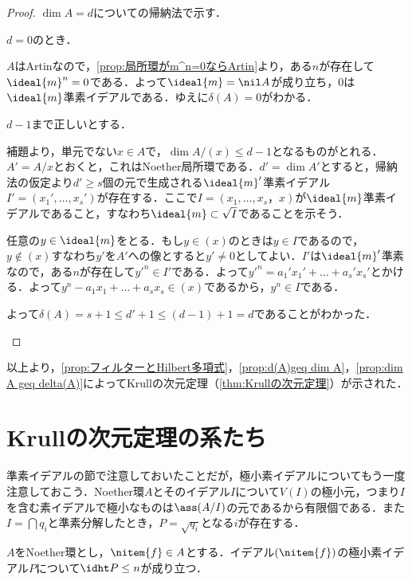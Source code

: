 \begin{proof}
	$\dim A=d$についての帰納法で示す．
	
	\begin{step}
		\item $d=0$のとき．
		
		$A$はArtinなので，\ref{prop:局所環がm^n=0ならArtin}より，ある$n$が存在して$\ideal{m}^n=0$である．よって$\ideal{m}=\nil A$が成り立ち，$0$は$\ideal{m}$準素イデアルである．ゆえに$\delta(A)=0$がわかる．
		
		\item $d-1$まで正しいとする．
		
		補題より，単元でない$x\in A$で，$\dim A/(x)\leq d-1$となるものがとれる．$A'=A/x$とおくと，これはNoether局所環である．$d'=\dim A'$とすると，帰納法の仮定より$d'\geq s$個の元で生成される$\ideal{m}'$準素イデアル$I'=(x_1',\dots,x_s')$が存在する．ここで$I=(x_1,\dots,x_s，x)$が$\ideal{m}$準素イデアルであること，すなわち$\ideal{m}\subset\sqrt{I}$であることを示そう．
		
		任意の$y\in\ideal{m}$をとる．もし$y\in (x)$のときは$y\in I$であるので，$y\not\in(x)$すなわち$y'$を$A'$への像とすると$y'\neq0$としてよい．$I'$は$\ideal{m}'$準素なので，ある$n$が存在して$y'^n\in I'$である．よって$y'^n=a_1'x_1'+\dots+a_s'x_s'$とかける．よって$y^n-a_1x_1+\dots+a_sx_s\in (x)$であるから，$y^n\in I$である．
		
		よって$\delta(A)=s+1\leq d'+1\leq (d-1)+1=d$であることがわかった．
	\end{step}
\end{proof}

以上より，\ref{prop:フィルターとHilbert多項式}，\ref{prop:d(A)geq dim A}，\ref{prop:dim A geq delta(A)}によってKrullの次元定理（\ref{thm:Krullの次元定理}）が示された．

\section{Krullの次元定理の系たち}

準素イデアルの節で注意しておいたことだが，極小素イデアルについてもう一度注意しておこう．Noether環$A$とそのイデアル$I$について$V(I)$の極小元，つまり$I$を含む素イデアルで極小なものは$\ass(A/I)$の元であるから有限個である．また$I=\bigcap q_i$と準素分解したとき，$P=\sqrt{q_i}$となる$i$が存在する．
\begin{thm}[Krullの標高定理]\label{thm:Krullの標高定理}
	$A$をNoether環とし，$\nitem{f}\in A$とする．イデアル$(\nitem{f})$の極小素イデアル$P$について$\idht P\leq n$が成り立つ．
\end{thm}

